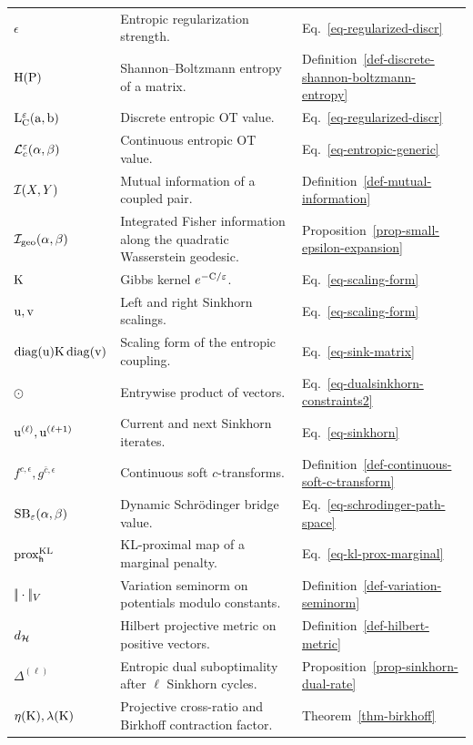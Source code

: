 {\begin{longtable}{>{\raggedright\arraybackslash}p{}
                  >{\raggedright\arraybackslash}p{}
                  >{\raggedright\arraybackslash}p{}}
\hline
\multicolumn{3}{l}{\textbf{Entropic regularization and Sinkhorn algorithms}}\\
\hline
$\epsilon$ & Entropic regularization strength. & Eq.~\eqref{eq-regularized-discr} \\
$\mathrm{H}(\mathrm{P})$ & Shannon--Boltzmann entropy of a matrix. & Definition~\ref{def-discrete-shannon-boltzmann-entropy} \\
$\mathrm{L}_{\mathrm{C}}^\varepsilon(\mathrm{a},\mathrm{b})$ & Discrete entropic OT value. & Eq.~\eqref{eq-regularized-discr} \\
$\mathcal{L}_c^\varepsilon(\alpha,\beta)$ & Continuous entropic OT value. & Eq.~\eqref{eq-entropic-generic} \\
$\mathcal{I}(X,Y)$ & Mutual information of a coupled pair. & Definition~\ref{def-mutual-information} \\
$\mathcal I_{\rm geo}(\alpha,\beta)$ & Integrated Fisher information along the quadratic Wasserstein geodesic. & Proposition~\ref{prop-small-epsilon-expansion} \\
$\mathrm{K}$ & Gibbs kernel $e^{-\mathrm{C}/\varepsilon}$. & Eq.~\eqref{eq-scaling-form} \\
$\mathrm{u},\mathrm{v}$ & Left and right Sinkhorn scalings. & Eq.~\eqref{eq-scaling-form} \\
$\operatorname{diag}(\mathrm{u})\mathrm{K}\operatorname{diag}(\mathrm{v})$ & Scaling form of the entropic coupling. & Eq.~\eqref{eq-sink-matrix} \\
$\odot$ & Entrywise product of vectors. & Eq.~\eqref{eq-dualsinkhorn-constraints2} \\
$\mathrm{u}^{(\ell)},\mathrm{u}^{(\ell+1)}$ & Current and next Sinkhorn iterates. & Eq.~\eqref{eq-sinkhorn} \\
$f^{c,\epsilon},g^{\bar c,\epsilon}$ & Continuous soft $c$-transforms. & Definition~\ref{def-continuous-soft-c-transform} \\
$\mathrm{SB}_\varepsilon(\alpha,\beta)$ & Dynamic Schr\"odinger bridge value. & Eq.~\eqref{eq-schrodinger-path-space} \\
$\operatorname{prox}_{\mathsf h}^{\mathrm{KL}}$ & KL-proximal map of a marginal penalty. & Eq.~\eqref{eq-kl-prox-marginal} \\
$|\!| \cdot |\!|_V$ & Variation seminorm on potentials modulo constants. & Definition~\ref{def-variation-seminorm} \\
$d_{\mathcal{H}}$ & Hilbert projective metric on positive vectors. & Definition~\ref{def-hilbert-metric} \\
$\Delta^{(\ell)}$ & Entropic dual suboptimality after $\ell$ Sinkhorn cycles. & Proposition~\ref{prop-sinkhorn-dual-rate} \\
$\eta(\mathrm{K}),\lambda(\mathrm{K})$ & Projective cross-ratio and Birkhoff contraction factor. & Theorem~\ref{thm-birkhoff} \\

\end{longtable}}
